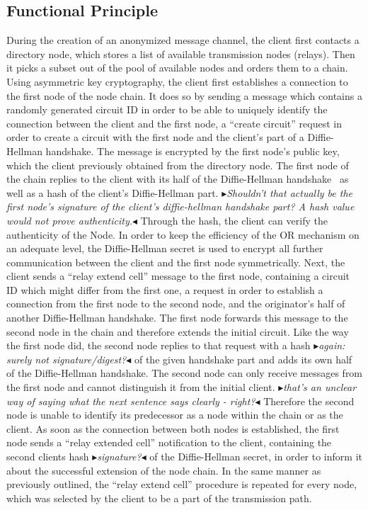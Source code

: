 \documentclass{sig-alternate}
\newcommand{\boxedtext}[1]{\fbox{\scriptsize\bfseries\textsf{#1}}}
\newcommand{\nota}[2]{
   \boxedtext{#1}
       {\small$\blacktriangleright$\emph{\textsl{#2}}$\blacktriangleleft$}
}
\newcommand\fk[1]{\nota{FK}{#1}}
\begin{document}
\subsection{Functional Principle}
During the creation of an anonymized message channel, the client first contacts a directory node, which stores a list of available transmission nodes (relays). Then it picks a subset out of the pool of available nodes and orders them to a chain. Using asymmetric key cryptography, the client first establishes a connection to the first node of the node chain. It does so by sending a message which contains a randomly generated circuit ID in order to be able to uniquely identify the connection between the client and the first node, a ``create circuit'' request in order to create a circuit with the first node and the client's part of a Diffie-Hellman handshake. The message is encrypted by the first node's public key, which the client previously obtained from the directory node. The first node of the chain replies to the client with its half of the Diffie-Hellman handshake~\cite{diffie1976new} as well as a hash of the client's Diffie-Hellman part.\fk{Shouldn't that actually be the first node's signature of the client's diffie-hellman handshake part? A hash value would not prove authenticity.} Through the hash, the client can verify the authenticity of the Node. In order to keep the efficiency of the OR mechanism on an adequate level, the Diffie-Hellman secret is used to encrypt all further communication between the client and the first node symmetrically. Next, the client sends a ``relay extend cell'' message to the first node, containing a circuit ID which might differ from the first one, a request in order to establish a connection from the first node to the second node, and the originator's half of another Diffie-Hellman handshake. The first node forwards this message to the second node in the chain and therefore extends the initial circuit. Like the way the first node did, the second node replies to that request with a hash\fk{again: surely not signature/digest?} of the given handshake part and adds its own half of the Diffie-Hellman handshake. The second node can only receive messages from the first node and cannot distinguish it from the initial client.\fk{that's an unclear way of saying what the next sentence says clearly - right?} Therefore the second node is unable to identify its predecessor as a node within the chain or as the client. As soon as the connection between both nodes is established, the first node sends a ``relay extended cell'' notification to the client, containing the second clients hash\fk{signature?} of the Diffie-Hellman secret, in order to inform it about the successful extension of the node chain. In the same manner as previously outlined, the ``relay extend cell'' procedure is repeated for every node, which was selected by the client to be a part of the transmission path.
\end{document}

